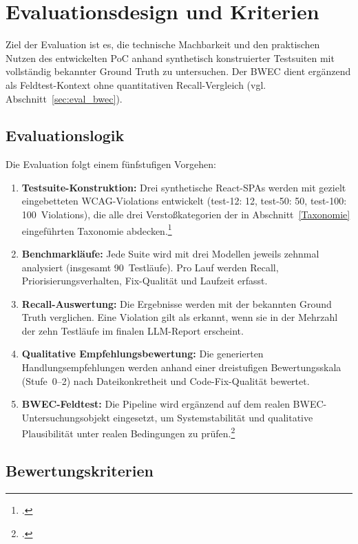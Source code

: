 \section{Evaluationsdesign und Kriterien} \label{sec:eval}

Ziel der Evaluation ist es, die technische Machbarkeit und den praktischen Nutzen des entwickelten \ac{PoC} anhand synthetisch konstruierter Testsuiten mit vollständig bekannter Ground Truth zu untersuchen. Der \ac{BWEC} dient ergänzend als Feldtest-Kontext ohne quantitativen Recall-Vergleich (vgl. Abschnitt~\ref{sec:eval_bwec}).

\subsection{Evaluationslogik}

Die Evaluation folgt einem fünfstufigen Vorgehen:

\begin{enumerate}
    \item \textbf{Testsuite-Konstruktion:} Drei synthetische React-\acp{SPA} werden mit gezielt eingebetteten \ac{WCAG}-Violations entwickelt (test-12: 12, test-50: 50, test-100: 100~Violations), die alle drei Verstoßkategorien der in Abschnitt~\ref{Taxonomie} eingeführten Taxonomie abdecken.\footcite[Vgl.][]{WCAG}
    \item \textbf{Benchmarkläufe:} Jede Suite wird mit drei Modellen jeweils zehnmal analysiert (insgesamt 90~Testläufe). Pro Lauf werden Recall, Priorisierungsverhalten, Fix-Qualität und Laufzeit erfasst.
    \item \textbf{Recall-Auswertung:} Die Ergebnisse werden mit der bekannten Ground Truth verglichen. Eine Violation gilt als erkannt, wenn sie in der Mehrzahl der zehn Testläufe im finalen \ac{LLM}-Report erscheint.
    \item \textbf{Qualitative Empfehlungsbewertung:} Die generierten Handlungsempfehlungen werden anhand einer dreistufigen Bewertungsskala (Stufe~0--2) nach Dateikonkretheit und Code-Fix-Qualität bewertet.
    \item \textbf{\ac{BWEC}-Feldtest:} Die Pipeline wird ergänzend auf dem realen \ac{BWEC}-Untersuchungs\-objekt eingesetzt, um Systemstabilität und qualitative Plausibilität unter realen Bedingungen zu prüfen.\footcites[Vgl.][]{axe}[][]{kodithuwakku_assessing_2025}
\end{enumerate}

\subsection{Bewertungskriterien}

